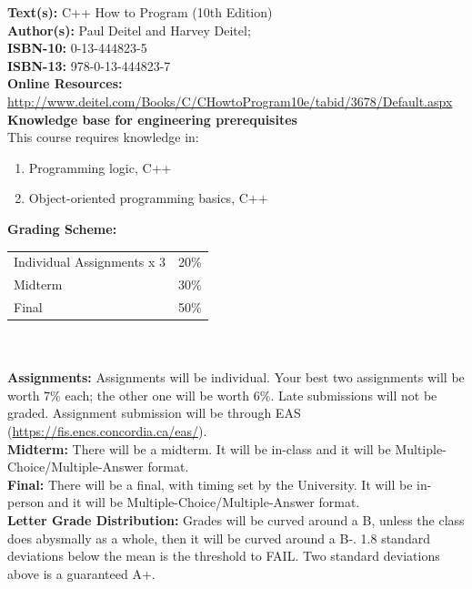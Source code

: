 \documentclass{CourseOutline}
\begin{document}
\textbf {\large Text(s):} C++ How to Program (10th Edition) \\
\textbf {Author(s):} Paul Deitel and Harvey Deitel; \\ 
\textbf {ISBN-10:} 0-13-444823-5 \\ 
\textbf {ISBN-13:} 978-0-13-444823-7 \\ 
\textbf {Online Resources:} \url{http://www.deitel.com/Books/C/CHowtoProgram10e/tabid/3678/Default.aspx} \\


\textbf {Knowledge base for engineering prerequisites}\\
This course requires knowledge in:
\begin{enumerate}
    \item Programming logic, C++
    \item Object-oriented programming basics, C++
\end{enumerate}


\textbf {\large Grading Scheme:} \\
\hspace*{40mm}
\begin{tabular}{ l l }
Individual Assignments x 3 & 20\% \\
Midterm & 30\% \\
Final & 50\% \\
\end{tabular} \\\\

\textbf {Assignments:} 
Assignments will be individual. Your best two assignments will be worth 7\% each; the other one will be worth 6\%. Late submissions will not be graded. Assignment submission will be through EAS (\url{https://fis.encs.concordia.ca/eas/}). \\

\textbf {Midterm:} There will be a midterm. It will be in-class and it will be Multiple-Choice/Multiple-Answer format.\\

\textbf {Final:} There will be a final, with timing set by the University.  It will be in-person and it will be Multiple-Choice/Multiple-Answer format.\\

\textbf {\large Letter Grade Distribution:} Grades will be curved around a B,
unless the class does abysmally as a whole, then it will be curved around a B-.
1.8 standard deviations below the mean is the threshold to FAIL. Two standard
deviations above is a guaranteed A+. \\
\end{document}
